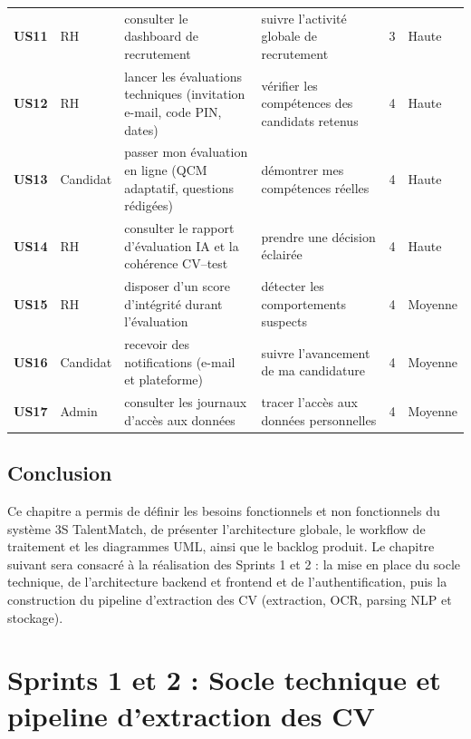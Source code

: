 \documentclass[12pt,a4paper]{report}
\begin{document}
{\begin{longtable}{>{\bfseries}p{0.9cm} p{1.9cm} p{4.6cm} p{4.0cm} p{1.1cm} p{1.4cm}}
US11 & RH & consulter le dashboard de recrutement & suivre l'activité globale de recrutement & 3 & Haute \\
\rowcolor{tabalt}
US12 & RH & lancer les évaluations techniques (invitation e-mail, code PIN, dates) & vérifier les compétences des candidats retenus & 4 & Haute \\
US13 & Candidat & passer mon évaluation en ligne (QCM adaptatif, questions rédigées) & démontrer mes compétences réelles & 4 & Haute \\
\rowcolor{tabalt}
US14 & RH & consulter le rapport d'évaluation IA et la cohérence CV--test & prendre une décision éclairée & 4 & Haute \\
US15 & RH & disposer d'un score d'intégrité durant l'évaluation & détecter les comportements suspects & 4 & Moyenne \\
\rowcolor{tabalt}
US16 & Candidat & recevoir des notifications (e-mail et plateforme) & suivre l'avancement de ma candidature & 4 & Moyenne \\
US17 & Admin & consulter les journaux d'accès aux données & tracer l'accès aux données personnelles & 4 & Moyenne \\
\end{longtable}
}

\section{Conclusion}

Ce chapitre a permis de définir les besoins fonctionnels et non fonctionnels du système 3S TalentMatch, de présenter l'architecture globale, le workflow de traitement et les diagrammes UML, ainsi que le backlog produit. Le chapitre suivant sera consacré à la réalisation des Sprints 1 et 2 : la mise en place du socle technique, de l'architecture backend et frontend et de l'authentification, puis la construction du pipeline d'extraction des CV (extraction, OCR, parsing NLP et stockage).

\newpage


\chapter{Sprints 1 et 2 : Socle technique et pipeline d'extraction des CV}
\end{document}
